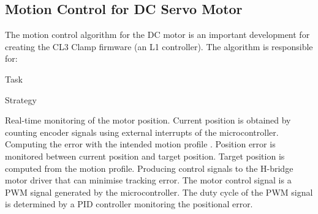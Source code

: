 \subsection{Motion Control for DC Servo Motor}
\label{subsection:exploration-2-motion-control-for-dc-servo-motor}

The motion control algorithm for the DC motor is an important development for creating the CL3 Clamp firmware (an L1 controller). The algorithm is responsible for:

Task

Strategy

Real-time monitoring of the motor position.
Current position is obtained by counting encoder signals using external interrupts of the microcontroller.
Computing the error with the intended motion profile .
Position error is monitored between current position and target position. 
Target position is computed from the motion profile.
Producing control signals to the H-bridge motor driver  that can minimise tracking error. 
The motor control signal is a PWM signal generated by the microcontroller. 
The duty cycle of the PWM signal is determined by a PID controller monitoring the positional error.

